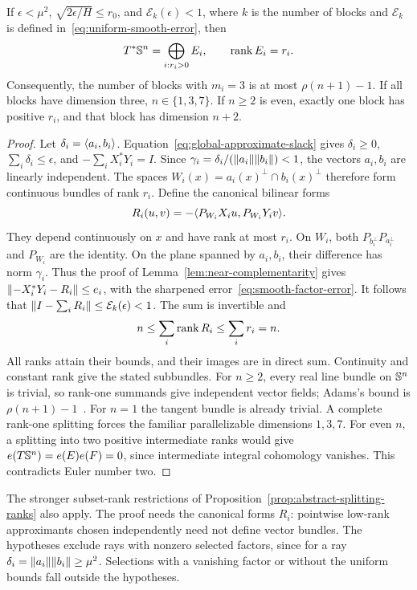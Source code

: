 \begin{theorem}
\label{thm:robust-splitting}
If $\epsilon<\mu^2$, $\sqrt{2\epsilon/H}\leq r_0$, and
$\mathcal E_k(\epsilon)<1$, where $k$ is the number of blocks and
$\mathcal E_k$ is defined in~\eqref{eq:uniform-smooth-error}, then
\[
 T^*\mathbb S^n=\bigoplus_{i:r_i>0}E_i,\qquad \operatorname{rank} E_i=r_i.
\]
Consequently, the number of blocks with $m_i=3$ is at most $\rho(n+1)-1$.
If all blocks have dimension three, $n\in\{1,3,7\}$.
If $n\geq2$ is even, exactly one block has positive $r_i$, and
that block has dimension $n+2$.
\end{theorem}
\begin{proof}
Let $\delta_i=\langle a_i,b_i\rangle$. Equation~\eqref{eq:global-approximate-slack}
gives $\delta_i\geq0$, $\sum_i\delta_i\leq\epsilon$, and
$-\sum_iX_i^*Y_i=I$. Since
$\gamma_i=\delta_i/(\lVert a_i\rVert\lVert b_i\rVert)<1$, the vectors $a_i,b_i$
are linearly independent. The spaces
$W_i(x)=a_i(x)^\perp\cap b_i(x)^\perp$ therefore form continuous
bundles of rank $r_i$. Define the canonical bilinear forms
\[
 R_i(u,v)=-\langle P_{W_i}X_i u,P_{W_i}Y_i v\rangle.
\]
They depend continuously on $x$ and have rank at most $r_i$.
On $W_i$, both $P_{b_i^\perp}P_{a_i^\perp}$ and $P_{W_i}$ are the
identity. On the plane spanned by $a_i,b_i$, their difference has norm $\gamma_i$.
Thus the proof of Lemma~\ref{lem:near-complementarity} gives
$\lVert -X_i^*Y_i-R_i\rVert\leq e_i$, with the sharpened
error~\eqref{eq:smooth-factor-error}. It follows that
$\lVert I-\sum_iR_i\rVert\leq\mathcal E_k(\epsilon)<1$.
The sum is invertible and
\[
 n\leq\sum_i\operatorname{rank} R_i\leq\sum_i r_i=n.
\]
All ranks attain their bounds, and their images are in direct sum.
Continuity and constant rank give the stated subbundles.
For $n\geq2$, every real line bundle on $\mathbb S^n$ is trivial, so
rank-one summands give independent vector fields; Adams's bound is
$\rho(n+1)-1$~\cite{Adams1962}. For $n=1$ the tangent bundle is
already trivial. A complete rank-one splitting forces the familiar
parallelizable dimensions $1,3,7$. For even $n$, a splitting into two
positive intermediate ranks would give
$e(T\mathbb S^n)=e(E)e(F)=0$, since intermediate integral cohomology vanishes.
This contradicts Euler number two.
\end{proof}

The stronger subset-rank restrictions of
Proposition~\ref{prop:abstract-splitting-ranks} also apply. The proof
needs the canonical forms $R_i$: pointwise low-rank approximants chosen
independently need not define vector bundles. The hypotheses exclude
rays with nonzero selected factors, since for a ray
$\delta_i=\lVert a_i\rVert\lVert b_i\rVert\geq\mu^2$. Selections with a vanishing
factor or without the uniform bounds fall outside the hypotheses.

